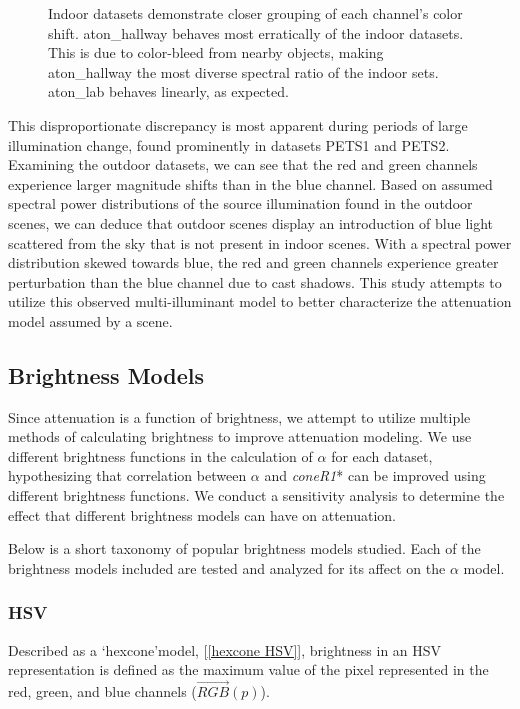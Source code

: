\begin{figure}
\caption{Indoor datasets demonstrate closer grouping of each channel's color shift. aton\_hallway behaves most erratically of the indoor datasets. This is due to color-bleed from nearby objects, making aton\_hallway the most diverse spectral ratio of the indoor sets. aton\_lab behaves linearly, as expected.}
\label{fig:rgshift_indoor}
\end{figure}

This disproportionate discrepancy is most apparent during periods of large illumination change, found prominently in datasets PETS1 and PETS2. Examining the outdoor datasets, we can see that the red and green channels experience larger magnitude shifts than in the blue channel. Based on assumed spectral power distributions of the source illumination found in the outdoor scenes, we can deduce that outdoor scenes display an introduction of blue light scattered from the sky that is not present in indoor scenes. With a spectral power distribution skewed towards blue, the red and green channels experience greater perturbation than the blue channel due to cast shadows. This study attempts to utilize this observed multi-illuminant model to better characterize the attenuation model assumed by a scene. 

\FloatBarrier
\subsection{Brightness Models} \label{section:brightnessmodels}

Since attenuation is a function of brightness, we attempt to utilize multiple methods of calculating brightness to improve attenuation modeling. We use different brightness functions in the calculation of $\alpha$ for each dataset, hypothesizing that correlation between $\alpha$ and \textit{coneR1}* can be improved using different brightness functions. We conduct a sensitivity analysis to determine the effect that different brightness models can have on attenuation.

Below is a short taxonomy of popular brightness models studied. Each of the brightness models included are tested and analyzed for its affect on the $\alpha$ model.

\subsubsection{HSV}

Described as a \lq{hexcone}\rq model, [\ref{hexcone HSV}], brightness in an HSV representation is defined as the maximum value of the pixel represented in the red, green, and blue channels ($\vec{RGB}(p)$).

